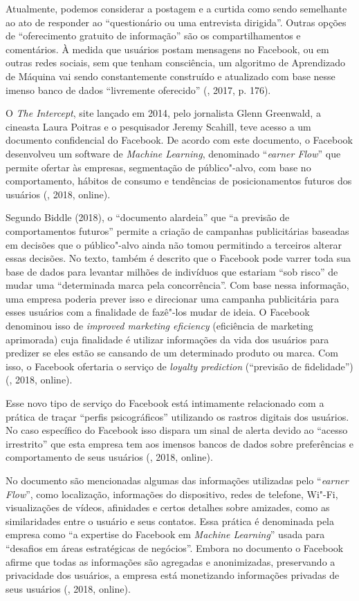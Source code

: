 Atualmente, podemos considerar a postagem e a curtida como sendo
semelhante ao ato de responder ao ``questionário ou uma entrevista
dirigida''. Outras opções de ``oferecimento gratuito de informação'' são
os compartilhamentos e comentários. À medida que usuários postam
mensagens no Facebook, ou em outras redes sociais, sem que tenham
consciência, um algoritmo de Aprendizado de Máquina vai sendo
constantemente construído e atualizado com base nesse imenso banco de
dados ``livremente oferecido'' (, 2017, p. 176).

O \emph{The Intercept}, site lançado em 2014, pelo jornalista Glenn
Greenwald, a cineasta Laura Poitras e o pesquisador Jeremy Scahill, teve
acesso a um documento confidencial do Facebook. De acordo com este
documento, o Facebook desenvolveu um software de \emph{Machine
Learning}, denominado ``\emph{earner Flow}'' que permite ofertar às
empresas, segmentação de público"-alvo, com base no comportamento,
hábitos de consumo e tendências de posicionamentos futuros dos usuários
(, 2018, online).

Segundo Biddle (2018), o ``documento alardeia'' que ``a previsão de
comportamentos futuros'' permite a criação de campanhas publicitárias
baseadas em decisões que o público"-alvo ainda não tomou permitindo a
terceiros alterar essas decisões. No texto, também é descrito que o
Facebook pode varrer toda sua base de dados para levantar milhões de
indivíduos que estariam ``sob risco'' de mudar uma ``determinada marca
pela concorrência''. Com base nessa informação, uma empresa poderia
prever isso e direcionar uma campanha publicitária para esses usuários
com a finalidade de fazê"-los mudar de ideia.
O Facebook denominou isso de \emph{improved marketing eficiency} (eficiência de marketing
aprimorada) cuja finalidade é utilizar informações da vida dos usuários
para predizer se eles estão se cansando de um determinado produto ou
marca. Com isso, o Facebook ofertaria o serviço de \emph{loyalty
prediction} (``previsão de fidelidade'') (, 2018, online).

Esse novo tipo de serviço do Facebook está intimamente relacionado com a
prática de traçar ``perfis psicográficos'' utilizando os rastros
digitais dos usuários. No caso específico do Facebook isso dispara um
sinal de alerta devido ao ``acesso irrestrito'' que esta empresa tem aos
imensos bancos de dados sobre preferências e comportamento de seus
usuários (, 2018, online).

No documento são mencionadas algumas das informações utilizadas pelo
``\emph{earner Flow}'', como localização, informações do dispositivo,
redes de telefone, Wi"-Fi, visualizações de vídeos, afinidades e certos
detalhes sobre amizades, como as similaridades entre o usuário e seus
contatos. Essa prática é denominada pela empresa como ``a expertise do
Facebook em \emph{Machine Learning}'' usada para ``desafios em áreas
estratégicas de negócios''. Embora no documento o Facebook afirme que
todas as informações são agregadas e anonimizadas, preservando a
privacidade dos usuários, a empresa está monetizando informações
privadas de seus usuários (, 2018, online).

